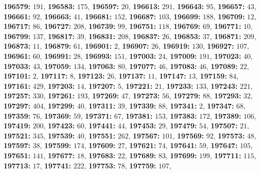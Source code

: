 \textsf{\bfseries 196579:} $191$, \textsf{\bfseries 196583:} $175$, \textsf{\bfseries 196597:} $20$, \textsf{\bfseries 196613:} $291$, \textsf{\bfseries 196643:} $95$, \textsf{\bfseries 196657:} $43$, \textsf{\bfseries 196661:} $92$, \textsf{\bfseries 196663:} $41$, \textsf{\bfseries 196681:} $152$, \textsf{\bfseries 196687:} $103$, \textsf{\bfseries 196699:} $188$, \textsf{\bfseries 196709:} $12$, \textsf{\bfseries 196717:} $86$, \textsf{\bfseries 196727:} $208$, \textsf{\bfseries 196739:} $99$, \textsf{\bfseries 196751:} $118$, \textsf{\bfseries 196769:} $69$, \textsf{\bfseries 196771:} $10$, \textsf{\bfseries 196799:} $137$, \textsf{\bfseries 196817:} $39$, \textsf{\bfseries 196831:} $208$, \textsf{\bfseries 196837:} $26$, \textsf{\bfseries 196853:} $37$, \textsf{\bfseries 196871:} $209$, \textsf{\bfseries 196873:} $11$, \textsf{\bfseries 196879:} $61$, \textsf{\bfseries 196901:} $2$, \textsf{\bfseries 196907:} $26$, \textsf{\bfseries 196919:} $130$, \textsf{\bfseries 196927:} $107$, \textsf{\bfseries 196961:} $60$, \textsf{\bfseries 196991:} $28$, \textsf{\bfseries 196993:} $151$, \textsf{\bfseries 197003:} $24$, \textsf{\bfseries 197009:} $191$, \textsf{\bfseries 197023:} $40$, \textsf{\bfseries 197033:} $43$, \textsf{\bfseries 197059:} $134$, \textsf{\bfseries 197063:} $80$, \textsf{\bfseries 197077:} $46$, \textsf{\bfseries 197083:} $46$, \textsf{\bfseries 197089:} $22$, \textsf{\bfseries 197101:} $2$, \textsf{\bfseries 197117:} $8$, \textsf{\bfseries 197123:} $26$, \textsf{\bfseries 197137:} $11$, \textsf{\bfseries 197147:} $13$, \textsf{\bfseries 197159:} $84$, \textsf{\bfseries 197161:} $429$, \textsf{\bfseries 197203:} $14$, \textsf{\bfseries 197207:} $5$, \textsf{\bfseries 197221:} $21$, \textsf{\bfseries 197233:} $133$, \textsf{\bfseries 197243:} $221$, \textsf{\bfseries 197257:} $330$, \textsf{\bfseries 197261:} $193$, \textsf{\bfseries 197269:} $47$, \textsf{\bfseries 197273:} $56$, \textsf{\bfseries 197279:} $88$, \textsf{\bfseries 197293:} $32$, \textsf{\bfseries 197297:} $404$, \textsf{\bfseries 197299:} $40$, \textsf{\bfseries 197311:} $39$, \textsf{\bfseries 197339:} $88$, \textsf{\bfseries 197341:} $2$, \textsf{\bfseries 197347:} $68$, \textsf{\bfseries 197359:} $76$, \textsf{\bfseries 197369:} $59$, \textsf{\bfseries 197371:} $67$, \textsf{\bfseries 197381:} $153$, \textsf{\bfseries 197383:} $172$, \textsf{\bfseries 197389:} $106$, \textsf{\bfseries 197419:} $200$, \textsf{\bfseries 197423:} $60$, \textsf{\bfseries 197441:} $44$, \textsf{\bfseries 197453:} $29$, \textsf{\bfseries 197479:} $54$, \textsf{\bfseries 197507:} $21$, \textsf{\bfseries 197521:} $345$, \textsf{\bfseries 197539:} $40$, \textsf{\bfseries 197551:} $262$, \textsf{\bfseries 197567:} $101$, \textsf{\bfseries 197569:} $92$, \textsf{\bfseries 197573:} $48$, \textsf{\bfseries 197597:} $38$, \textsf{\bfseries 197599:} $174$, \textsf{\bfseries 197609:} $27$, \textsf{\bfseries 197621:} $74$, \textsf{\bfseries 197641:} $59$, \textsf{\bfseries 197647:} $105$, \textsf{\bfseries 197651:} $141$, \textsf{\bfseries 197677:} $18$, \textsf{\bfseries 197683:} $22$, \textsf{\bfseries 197689:} $83$, \textsf{\bfseries 197699:} $199$, \textsf{\bfseries 197711:} $115$, \textsf{\bfseries 197713:} $17$, \textsf{\bfseries 197741:} $222$, \textsf{\bfseries 197753:} $78$, \textsf{\bfseries 197759:} $107$, 
